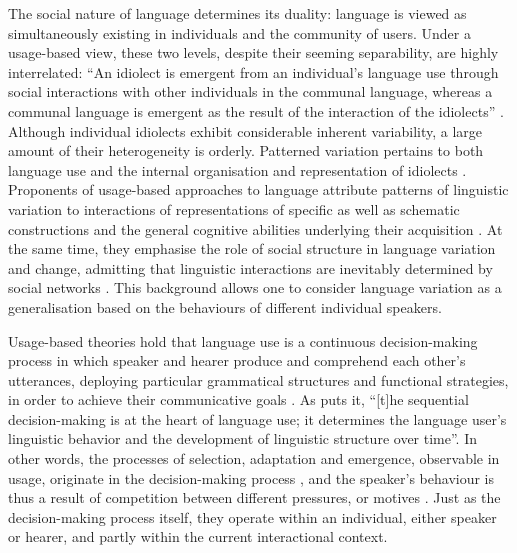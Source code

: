 The social nature of language determines its duality: language is viewed as simultaneously existing in individuals and the community of users. Under a usage-based view, these two levels, despite their seeming separability, are highly interrelated: ``An idiolect is emergent from an individual's language use through social interactions with other individuals in the communal language, whereas a communal language is emergent as the result of the interaction of the idiolects'' \citep[15]{five-graces}. Although individual idiolects exhibit considerable inherent variability, a large amount of their heterogeneity is orderly. Patterned variation pertains to both language use \citep{weinreich-etal68} and the internal organisation and representation of idiolects \citep{dabrowska1997}. Proponents of usage-based approaches to language attribute patterns of linguistic variation to interactions of representations of specific as well as schematic constructions and the general cognitive abilities underlying their acquisition \citep[15]{five-graces}. At the same time, they emphasise the role of social structure in language variation and change, admitting that linguistic interactions are inevitably determined by social networks \citep{milroy1980,eckert2000}. This background allows one to consider language variation as a generalisation based on the behaviours of different individual speakers.

Usage-based theories hold that language use is a continuous decision-making process in which speaker and hearer produce and comprehend each other's utterances, deploying particular grammatical structures and functional strategies, in order to achieve their communicative goals \citep{bates-macwhinney1989,five-graces,bybee-book-2010,dubois2014,macwhinney2014,christiansen-chater-2016}. As \citet[][841]{diessel-review} puts it, ``[t]he sequential decision-making is at the heart of language use; it determines the language user's linguistic behavior and the development of linguistic structure over time''. In other words, the processes of selection, adaptation and emergence, observable in usage, originate in the decision-making process \citep[264--265]{dubois2014}, and the speaker's behaviour is thus a result of competition between different pressures, or motives \citep{bates-macwhinney1989,competing}. Just as the decision-making process itself, they operate within an individual, either speaker or hearer, and partly within the current interactional context.

